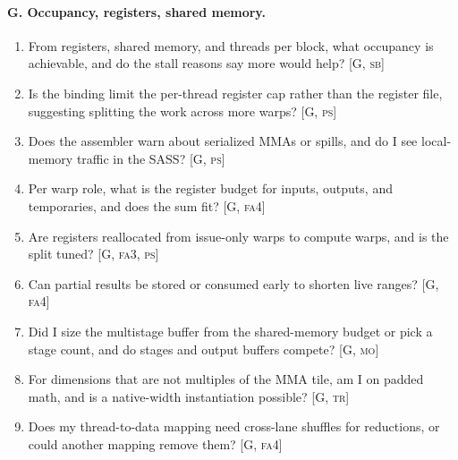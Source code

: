 \paragraph{G. Occupancy, registers, shared memory.}
\begin{enumerate}[nosep,leftmargin=*,resume]
\item From registers, shared memory, and threads per block, what occupancy is achievable, and do the stall reasons say more would help? [G, \textsc{sb}]
\item Is the binding limit the per-thread register cap rather than the register file, suggesting splitting the work across more warps? [G, \textsc{ps}]
\item Does the assembler warn about serialized MMAs or spills, and do I see local-memory traffic in the SASS? [G, \textsc{ps}]
\item Per warp role, what is the register budget for inputs, outputs, and temporaries, and does the sum fit? [G, \textsc{fa4}]
\item Are registers reallocated from issue-only warps to compute warps, and is the split tuned? [G, \textsc{fa3}, \textsc{ps}]
\item Can partial results be stored or consumed early to shorten live ranges? [G, \textsc{fa4}]
\item Did I size the multistage buffer from the shared-memory budget or pick a stage count, and do stages and output buffers compete? [G, \textsc{mo}]
\item For dimensions that are not multiples of the MMA tile, am I on padded math, and is a native-width instantiation possible? [G, \textsc{tr}]
\item Does my thread-to-data mapping need cross-lane shuffles for reductions, or could another mapping remove them? [G, \textsc{fa4}]
\end{enumerate}

